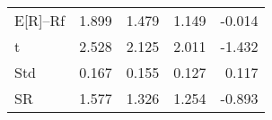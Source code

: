 \begin{tabular}{lrrrr}
\toprule
\midrule
E[R]--Rf & 1.899 & 1.479 & 1.149 & -0.014 \\
t & 2.528 & 2.125 & 2.011 & -1.432 \\
Std & 0.167 & 0.155 & 0.127 & 0.117 \\
SR & 1.577 & 1.326 & 1.254 & -0.893 \\
\bottomrule
\end{tabular}
